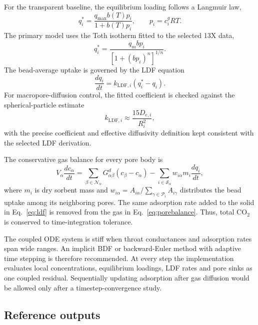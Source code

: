 \documentclass[12pt,a4paper]{article}
\begin{document}
For the transparent baseline, the equilibrium loading follows a Langmuir law,
\begin{equation}
 q_i^*=\frac{q_{\max}b(T)p_i}
 {1+b(T)p_i}, \qquad p_i=c_i^gRT.
 \label{eq:langmuir}
\end{equation}
The primary model uses the Toth isotherm fitted to the selected 13X data,
\begin{equation}
 q_i^*=\frac{q_m b p_i}
 {\left[1+(b p_i)^n\right]^{1/n}}.
 \label{eq:toth}
\end{equation}
The bead-average uptake is governed by the LDF equation
\begin{equation}
 \frac{dq_i}{dt}=k_{\mathrm{LDF},i}
 \left(q_i^*-q_i\right).
 \label{eq:ldf}
\end{equation}
For macropore-diffusion control, the fitted coefficient is checked against the
spherical-particle estimate
\begin{equation}
 k_{\mathrm{LDF},i}\approx
 \frac{15D_{e,i}}{R_i^2},
 \label{eq:ldfcheck}
\end{equation}
with the precise coefficient and effective diffusivity definition kept
consistent with the selected LDF derivation.

The conservative gas balance for every pore body is
\begin{equation}
 V_\alpha\frac{dc_\alpha}{dt}
 =\sum_{\beta\in\mathcal N_\alpha}
 G_{\alpha\beta}^{d}(c_\beta-c_\alpha)
 -\sum_{i\in\mathcal S_\alpha}
 w_{i\alpha}m_i\frac{dq_i}{dt},
 \label{eq:porebalance}
\end{equation}
where $m_i$ is dry sorbent mass and
$w_{i\alpha}=A_{i\alpha}/\sum_{\gamma\in\mathcal P_i}A_{i\gamma}$ distributes
the bead uptake among its neighboring pores. The same adsorption rate added to
the solid in Eq.~\eqref{eq:ldf} is removed from the gas in
Eq.~\eqref{eq:porebalance}. Thus, total CO$_2$ is conserved to time-integration
tolerance.

The coupled ODE system is stiff when throat conductances and adsorption rates
span wide ranges. An implicit BDF or backward-Euler method with adaptive time
stepping is therefore recommended. At every step the implementation evaluates
local concentrations, equilibrium loadings, LDF rates and pore sinks as one
coupled residual. Sequentially updating adsorption after gas diffusion would be
allowed only after a timestep-convergence study.

\subsection{Reference outputs}
\end{document}
